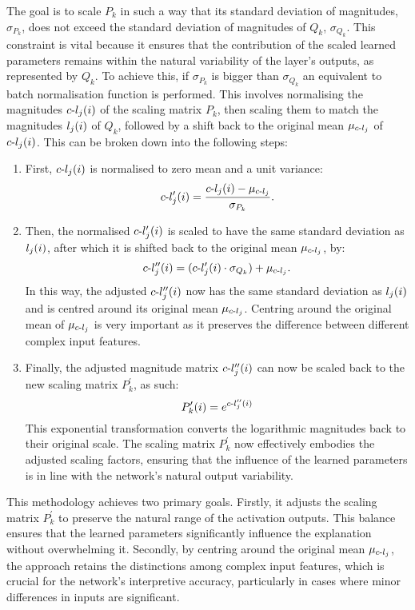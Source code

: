 The goal is to scale \(P_{k}\) in such a way that its standard deviation of magnitudes, \(\sigma_{P_k}\), does not exceed the standard deviation of magnitudes of \(Q_{k}\), \(\sigma_{Q_k}\). This constraint is vital because it ensures that the contribution of the scaled learned parameters remains within the natural variability of the layer’s outputs, as represented by \(Q_{k}\). To achieve this, if  \(\sigma_{P_k}\) is bigger than  \(\sigma_{Q_k}\) an equivalent to batch normalisation function is performed. This involves normalising the magnitudes \( \text{$c$-}l_{j}(i) \) of the scaling matrix \( P_{k} \), then scaling them to match the magnitudes \( l_{j}(i) \) of \( Q_{k} \), followed by a shift back to the original mean \( \mu_{\text{$c$-}l_{j}} \) of \( \text{$c$-}l_{j}(i) \). This can be broken down into the following steps:
\begin{enumerate}
    \item First, \( \text{$c$-}l_{j}(i) \) is normalised to zero mean and a unit variance:
\begin{equation*}
    \text{$c$-}l_{j}'(i) = \frac{\text{$c$-}l_{j}(i) - \mu_{\text{$c$-}l_{j}}}{\sigma_{P_k}}.
\end{equation*}
    \item Then, the normalised \( \text{$c$-}l_{j}'(i) \) is scaled to have the same standard deviation as \( l_{j}(i) \), after which it is shifted back to the original mean \( \mu_{\text{$c$-}l_{j}} \), by:
\begin{equation*}
    \text{$c$-}l_{j}''(i) = (\text{$c$-}l_{j}'(i) \cdot \sigma_{Q_k}) + \mu_{\text{$c$-}l_{j}}.
\end{equation*}
In this way, the adjusted \(\text{$c$-}l_{j}''(i)\) now has the same standard deviation as \(l_{j}(i)\) and is centred around its original mean $\mu_{\text{$c$-}l_{j}}$. Centring around the original mean of $\mu_{\text{$c$-}l_{j}}$ is very important as it preserves the difference between different complex input features.
    \item Finally, the adjusted magnitude matrix \(\text{$c$-}l_{j}''(i)\) can now be scaled back to the new scaling matrix \(P_{k}^\prime\), as such:
\begin{equation*}
    P_{k}^\prime(i) = e^{\text{$c$-}l_{j}''(i)}
\end{equation*}
This exponential transformation converts the logarithmic magnitudes back to their original scale. The scaling matrix \(P_{k}^\prime\) now effectively embodies the adjusted scaling factors, ensuring that the influence of the learned parameters is in line with the network's natural output variability.
\end{enumerate}

This methodology achieves two primary goals. Firstly, it adjusts the scaling matrix \(P_{k}^\prime\) to preserve the natural range of the activation outputs. This balance ensures that the learned parameters significantly influence the explanation without overwhelming it. Secondly, by centring around the original mean \(\mu_{\text{$c$-}l_{j}}\), the approach retains the distinctions among complex input features, which is crucial for the network's interpretive accuracy, particularly in cases where minor differences in inputs are significant.


